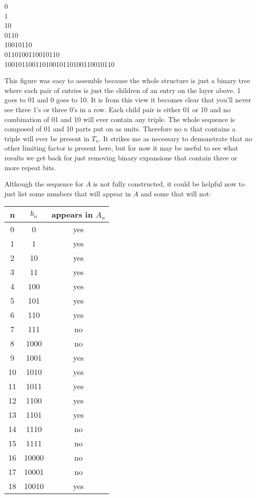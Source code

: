 \documentclass{article}
\begin{document}
\begin{center}
    0 \\
    1 \\
    10 \\
    0110 \\
    10010110 \\
    0110100110010110 \\
    10010110011010010110100110010110 \\
\end{center}

This figure was easy to assemble because the whole structure is just a binary tree where each pair of entries is just the children of an entry on the layer above.  1 goes to 01 and 0 goes to 10.  It is from this view it becomes clear that you'll never see three 1's or three 0's in a row.  Each child pair is either 01 or 10 and no combination of 01 and 10 will ever contain any triple.  The whole sequence is composed of 01 and 10 parts put on as units.  Therefore no $n$ that contains a triple will ever be present in $T_n$.  It strikes me as necessary to demonstrate that no other limiting factor is present here, but for now it may be useful to see what results we get back for just removing binary expansions that contain three or more repeat bits.

\par

Although the sequence for $A$ is not fully constructed, it could be helpful now to just list some numbers that will appear in $A$ and some that will not:

\begin{center}
    \begin{tabular}{c | c | c}
        n & $b_{n}$ & appears in $A_n$ \\
        \hline
        0 & 0 & yes \\
        1 & 1 & yes \\
        2 & 10 & yes \\
        3 & 11 & yes \\
        4 & 100 & yes \\
        5 & 101 & yes \\
        6 & 110 & yes \\
        7 & 111 & no \\
        8 & 1000 & no \\
        9 & 1001 & yes \\
        10 & 1010 & yes \\
        11 & 1011 & yes \\
        12 & 1100 & yes \\
        13 & 1101 & yes \\
        14 & 1110 & no \\
        15 & 1111 & no \\
        16 & 10000 & no \\
        17 & 10001 & no \\
        18 & 10010 & yes \\
    \end{tabular}
\end{center}
\end{document}
